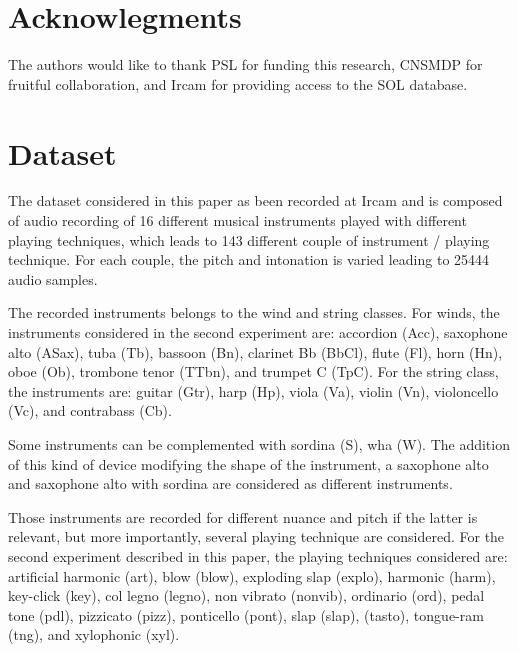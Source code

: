 \documentclass{article}
\begin{document}
\section*{Acknowlegments}

The authors would like to thank
PSL for funding this research,
CNSMDP for fruitful collaboration,
and Ircam for providing access to the SOL database.






\section{Dataset} \label{sec:dataset}

The dataset considered in this paper as been recorded at Ircam and is composed of audio recording of 16 different musical instruments played with different playing techniques, which leads to 143 different couple of instrument / playing technique. For each couple, the pitch and intonation is varied leading to 25444 audio samples.

The recorded instruments belongs to the wind and string classes. For winds, the instruments considered in the second experiment are: accordion (Acc), saxophone alto (ASax), tuba (Tb), bassoon (Bn), clarinet Bb (BbCl), flute (Fl), horn (Hn), oboe (Ob), trombone tenor (TTbn), and trumpet C (TpC). For the string class, the instruments are: guitar (Gtr), harp (Hp), viola (Va), violin (Vn), violoncello (Vc), and contrabass (Cb).

Some instruments can be complemented with sordina (S), wha (W). The addition of this kind of device modifying the shape of the instrument, a saxophone alto and saxophone alto with sordina are considered as different instruments.

Those instruments are recorded for different nuance and pitch if the latter is relevant, but more importantly, several playing technique are considered. For  the second experiment described in this paper, the playing techniques considered are: artificial harmonic (art), blow (blow), exploding slap  (explo), harmonic (harm), key-click (key), col legno   (legno), non vibrato (nonvib), ordinario (ord), pedal tone (pdl), pizzicato (pizz), ponticello (pont), slap (slap), (tasto), tongue-ram (tng), and xylophonic (xyl).
\end{document}
